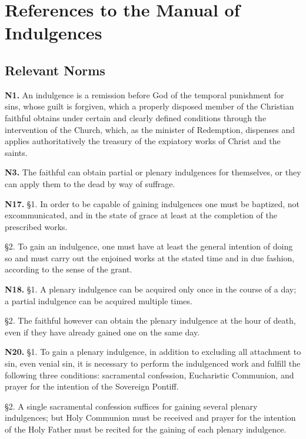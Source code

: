 \documentclass[12pt]{article}
\begin{document}

\newpage
\appendix
\section{References to the Manual of Indulgences}
\subsection{Relevant Norms}
\newcommand{\norm}[1]{\textbf{N#1.}\newline}
\newcommand{\subnorm}[1]{§#1.}
\norm{1}
An indulgence is a remission before God of the temporal punishment for sins, whose guilt is forgiven, which a properly disposed member of the Christian faithful obtains under certain and clearly defined conditions through the intervention of the Church, which, as the minister of Redemption, dispenses and applies authoritatively the treasury of the expiatory works of Christ and the saints.

\norm{3}
The faithful can obtain partial or plenary indulgences for themselves, or they can apply them to the dead by way of suffrage.

\norm{17}
\subnorm{1} In order to be capable of gaining indulgences one must be baptized, not excommunicated, and in the state of grace at least at the completion of the prescribed works.

\subnorm{2} To gain an indulgence, one must have at least the general intention of doing so and must carry out the enjoined works at the stated time and in due fashion, according to the sense of the grant.

\norm{18}
\subnorm{1} A plenary indulgence can be acquired only once in the course of a day; a partial indulgence can be acquired multiple times.

\subnorm{2} The faithful however can obtain the plenary indulgence at the hour of death, even if they have already gained one on the same day.

\norm{20}
\subnorm{1} To gain a plenary indulgence, in addition to excluding all attachment to sin, even venial sin, it is necessary to perform the indulgenced work and fulfill the following three conditions:
sacramental confession, Eucharistic Communion, and prayer for the intention of the Sovereign Pontiff.

\subnorm{2} A single sacramental confession suffices for gaining several plenary indulgences;
but Holy Communion must be received and prayer for the intention of the Holy Father must be recited for the gaining of each plenary indulgence.
\end{document}
